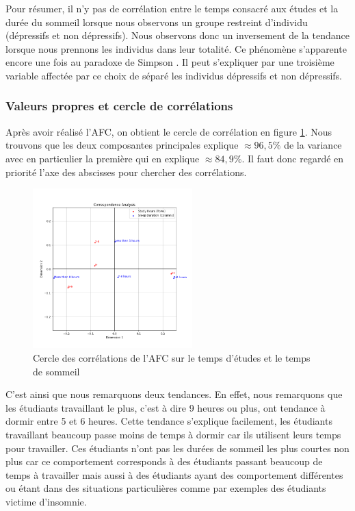 Pour résumer, il n'y pas de corrélation entre le temps consacré aux études et la durée du sommeil lorsque nous observons un groupe restreint d'individu (dépressifs et non dépressifs).
Nous observons donc un inversement de la tendance lorsque nous prennons les individus dans leur totalité.
Ce phénomène s'apparente encore une fois au paradoxe de Simpson \citep{simpson}. Il peut s'expliquer par une troisième variable affectée par ce choix de séparé les individus dépressifs et non dépressifs.

\subsubsection{Valeurs propres et cercle de corrélations}
 
Après avoir réalisé l'AFC, on obtient le cercle de corrélation en figure \ref{fig:corrStudySleep}. 
Nous trouvons que les deux composantes principales explique $\approx96,5\%$ de la variance avec en particulier la première qui en explique $\approx84,9\%$.
Il faut donc regardé en priorité l'axe des abscisses pour chercher des corrélations.


\begin{figure}[H]
    \begin{center}
      \includegraphics[width=0.55\textwidth,height=0.325\textheight,keepaspectratio]{Images/Study_Sleep_all/Corr_circle.png}
    \end{center}
    \caption{Cercle des corrélations de l'AFC sur le temps d'études et le temps de sommeil}
    \label{fig:corrStudySleep}
\end{figure}

C'est ainsi que nous remarquons deux tendances. 
En effet, nous remarquons que les étudiants travaillant le plus, c'est à dire 9 heures ou plus, ont tendance à dormir entre 5 et 6 heures. 
Cette tendance s'explique facilement, les étudiants travaillant beaucoup passe moins de temps à dormir car ils utilisent leurs temps pour travailler.
Ces étudiants n'ont pas les durées de sommeil les plus courtes non plus car ce comportement corresponds à des étudiants passant beaucoup de temps à travailler mais aussi à des étudiants ayant des comportement différentes ou étant dans des situations particulières comme par exemples des étudiants victime d'insomnie.

